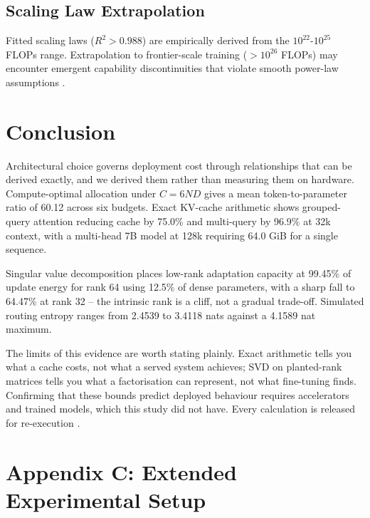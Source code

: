\documentclass{article}
\begin{document}
\subsection{Scaling Law Extrapolation}


Fitted scaling laws ($R^2 > 0.988$) are empirically derived from the $10^{22}$-$10^{25}$ FLOPs range. Extrapolation to frontier-scale training ($>10^{26}$ FLOPs) may encounter emergent capability discontinuities that violate smooth power-law assumptions \cite{arxiv_2501_02497}.




\section{Conclusion}


Architectural choice governs deployment cost through relationships that can be derived exactly, and we derived them rather than measuring them on hardware. Compute-optimal allocation under $C = 6ND$ gives a mean token-to-parameter ratio of 60.12 across six budgets. Exact KV-cache arithmetic shows grouped-query attention reducing cache by 75.0\% and multi-query by 96.9\% at 32k context, with a multi-head 7B model at 128k requiring 64.0 GiB for a single sequence.

Singular value decomposition places low-rank adaptation capacity at 99.45\% of update energy for rank 64 using 12.5\% of dense parameters, with a sharp fall to 64.47\% at rank 32 -- the intrinsic rank is a cliff, not a gradual trade-off. Simulated routing entropy ranges from 2.4539 to 3.4118 nats against a 4.1589 nat maximum.

The limits of this evidence are worth stating plainly. Exact arithmetic tells you what a cache costs, not what a served system achieves; SVD on planted-rank matrices tells you what a factorisation can represent, not what fine-tuning finds. Confirming that these bounds predict deployed behaviour requires accelerators and trained models, which this study did not have. Every calculation is released for re-execution \cite{arxiv_2406_00584,crossref_10_1201_9788743808145_14}.





\section{Appendix C: Extended Experimental Setup}
\end{document}
